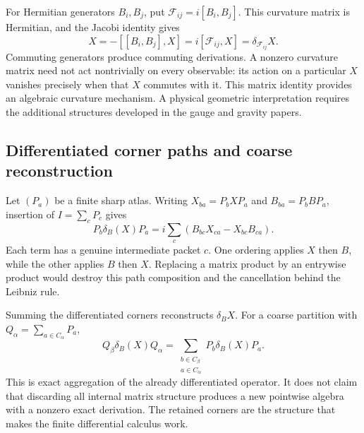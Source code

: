 For Hermitian generators $B_i,B_j$, put $\mathcal F_{ij}=i[B_i,B_j]$. This curvature matrix is Hermitian, and the Jacobi identity gives
\begin{equation}
 [\delta_{B_i},\delta_{B_j}]X
 =-[[B_i,B_j],X]
 =i[\mathcal F_{ij},X]=\delta_{\mathcal F_{ij}}X.
 \label{eq:foundation-corner-curvature}
\end{equation}
Commuting generators produce commuting derivations. A nonzero curvature matrix need not act nontrivially on every observable: its action on a particular $X$ vanishes precisely when that $X$ commutes with it. This matrix identity provides an algebraic curvature mechanism. A physical geometric interpretation requires the additional structures developed in the gauge and gravity papers.


\subsection{Differentiated corner paths and coarse reconstruction}

Let $(P_a)$ be a finite sharp atlas. Writing $X_{ba}=P_bXP_a$ and $B_{ba}=P_bBP_a$, insertion of $I=\sum_cP_c$ gives
\begin{equation}
 P_b\delta_B(X)P_a
 =i\sum_c\left(B_{bc}X_{ca}-X_{bc}B_{ca}\right).
 \label{eq:foundation-corner-path}
\end{equation}
Each term has a genuine intermediate packet $c$. One ordering applies $X$ then $B$, while the other applies $B$ then $X$. Replacing a matrix product by an entrywise product would destroy this path composition and the cancellation behind the Leibniz rule.

Summing the differentiated corners reconstructs $\delta_BX$. For a coarse partition with $Q_\alpha=\sum_{a\in C_\alpha}P_a$,
\[
 Q_\beta\delta_B(X)Q_\alpha
 =\sum_{\substack{b\in C_\beta\\a\in C_\alpha}}P_b\delta_B(X)P_a.
\]
This is exact aggregation of the already differentiated operator. It does not claim that discarding all internal matrix structure produces a new pointwise algebra with a nonzero exact derivation. The retained corners are the structure that makes the finite differential calculus work.


